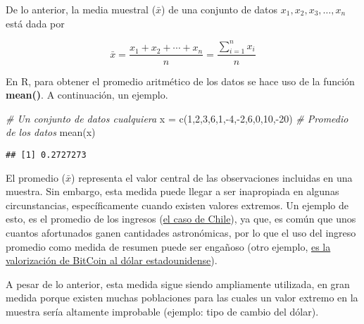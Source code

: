 \documentclass[
]{book}
\newenvironment{Shaded}{\begin{snugshade}}{\end{snugshade}}
\newcommand{\CommentTok}[1]{\textcolor[rgb]{0.56,0.35,0.01}{\textit{#1}}}
\newcommand{\DecValTok}[1]{\textcolor[rgb]{0.00,0.00,0.81}{#1}}
\newcommand{\FunctionTok}[1]{\textcolor[rgb]{0.00,0.00,0.00}{#1}}
\newcommand{\NormalTok}[1]{#1}
\newcommand{\OtherTok}[1]{\textcolor[rgb]{0.56,0.35,0.01}{#1}}
\newcommand{\SpecialCharTok}[1]{\textcolor[rgb]{0.00,0.00,0.00}{#1}}
\begin{document}
De lo anterior, la media muestral (\(\bar{x}\)) de una conjunto de datos \(x_1, x_2, x_3, \ldots, x_n\) está dada por \citep[página 25]{Devore}

\[
\bar{x} = \frac{x_1 + x_2 + \cdots + x_n}{n} = \frac{\displaystyle\sum_{i=1}^{n}x_i}{n}
\]

En R, para obtener el promedio aritmético de los datos se hace uso de la función \textbf{mean()}. A continuación, un ejemplo.

\begin{Shaded}
\begin{Highlighting}[]
\CommentTok{\# Un conjunto de datos cualquiera}
\NormalTok{x }\OtherTok{=} \FunctionTok{c}\NormalTok{(}\DecValTok{1}\NormalTok{,}\DecValTok{2}\NormalTok{,}\DecValTok{3}\NormalTok{,}\DecValTok{6}\NormalTok{,}\DecValTok{1}\NormalTok{,}\SpecialCharTok{{-}}\DecValTok{4}\NormalTok{,}\SpecialCharTok{{-}}\DecValTok{2}\NormalTok{,}\DecValTok{6}\NormalTok{,}\DecValTok{0}\NormalTok{,}\DecValTok{10}\NormalTok{,}\SpecialCharTok{{-}}\DecValTok{20}\NormalTok{)}
\CommentTok{\# Promedio de los datos}
\FunctionTok{mean}\NormalTok{(x)}
\end{Highlighting}
\end{Shaded}

\begin{verbatim}
## [1] 0.2727273
\end{verbatim}

El promedio (\(\bar{x}\)) representa el valor central de las observaciones incluidas en una muestra. Sin embargo, esta medida puede llegar a ser inapropiada en algunas circunstancias, específicamente cuando existen valores extremos. Un ejemplo de esto, es el promedio de los ingresos (\href{https://www.ine.gob.cl/prensa/detalle-prensa/2022/07/21/el-ingreso-laboral-promedio-mensual-en-chile-fue-de-$681.039-en-2021\#:~:text=El\%20ingreso\%20laboral\%20promedio\%20mensual\%20en\%20Chile\%20fue\%20de\%20\%24681.039\%20en\%202021,-21\%2F07\%2F2022\&text=El\%2050\%25\%20de\%20las\%20personas,ingreso\%20de\%20hasta\%20\%24457.690\%20mensuales.}{el caso de Chile}), ya que, es común que unos cuantos afortunados ganen cantidades astronómicas, por lo que el uso del ingreso promedio como medida de resumen puede ser engañoso (otro ejemplo, \href{https://www.google.com/finance/quote/BTC-USD?sa=X\&ved=2ahUKEwi3po-_m9n8AhWUL7kGHTNFCfYQ-fUHegQIFhAe\&window=MAX}{es la valorización de BitCoin al dólar estadounidense}).

A pesar de lo anterior, esta medida sigue siendo ampliamente utilizada, en gran medida porque existen muchas poblaciones para las cuales un valor extremo en la muestra sería altamente improbable (ejemplo: tipo de cambio del dólar).
\end{document}
